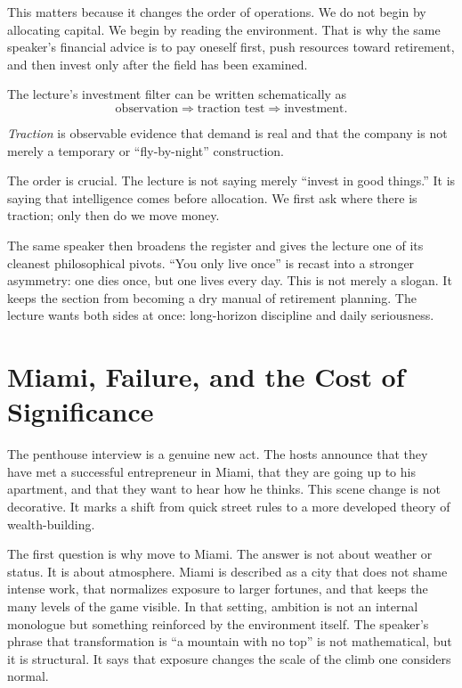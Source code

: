 This matters because it changes the order of operations. We do not begin by allocating capital. We begin by reading the environment. That is why the same speaker's financial advice is to pay oneself first, push resources toward retirement, and then invest only after the field has been examined.

The lecture's investment filter can be written schematically as
\begin{equation}
\text{observation} \Rightarrow \text{traction test} \Rightarrow \text{investment}.
\end{equation}

\begin{definition}
\emph{Traction} is observable evidence that demand is real and that the company is not merely a temporary or ``fly-by-night'' construction.
\end{definition}

The order is crucial. The lecture is not saying merely ``invest in good things.'' It is saying that intelligence comes before allocation. We first ask where there is traction; only then do we move money.

The same speaker then broadens the register and gives the lecture one of its cleanest philosophical pivots. ``You only live once'' is recast into a stronger asymmetry: one dies once, but one lives every day. This is not merely a slogan. It keeps the section from becoming a dry manual of retirement planning. The lecture wants both sides at once: long-horizon discipline and daily seriousness.

\section{Miami, Failure, and the Cost of Significance}

The penthouse interview is a genuine new act. The hosts announce that they have met a successful entrepreneur in Miami, that they are going up to his apartment, and that they want to hear how he thinks. This scene change is not decorative. It marks a shift from quick street rules to a more developed theory of wealth-building.

The first question is why move to Miami. The answer is not about weather or status. It is about atmosphere. Miami is described as a city that does not shame intense work, that normalizes exposure to larger fortunes, and that keeps the many levels of the game visible. In that setting, ambition is not an internal monologue but something reinforced by the environment itself. The speaker's phrase that transformation is ``a mountain with no top'' is not mathematical, but it is structural. It says that exposure changes the scale of the climb one considers normal.

